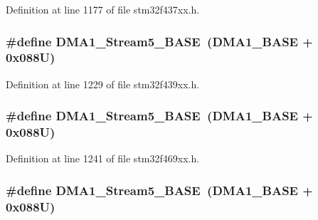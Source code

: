 Definition at line 1177 of file stm32f437xx.\+h.

\subsubsection[{\texorpdfstring{D\+M\+A1\+\_\+\+Stream5\+\_\+\+B\+A\+SE}{DMA1_Stream5_BASE}}]{\setlength{\rightskip}{0pt plus 5cm}\#define D\+M\+A1\+\_\+\+Stream5\+\_\+\+B\+A\+SE~({\bf D\+M\+A1\+\_\+\+B\+A\+SE} + 0x088\+U)}\hypertarget{group___peripheral__memory__map_ga0ded7bed8969fe2e2d616e7f90eb7654}{}\label{group___peripheral__memory__map_ga0ded7bed8969fe2e2d616e7f90eb7654}


Definition at line 1229 of file stm32f439xx.\+h.

\subsubsection[{\texorpdfstring{D\+M\+A1\+\_\+\+Stream5\+\_\+\+B\+A\+SE}{DMA1_Stream5_BASE}}]{\setlength{\rightskip}{0pt plus 5cm}\#define D\+M\+A1\+\_\+\+Stream5\+\_\+\+B\+A\+SE~({\bf D\+M\+A1\+\_\+\+B\+A\+SE} + 0x088\+U)}\hypertarget{group___peripheral__memory__map_ga0ded7bed8969fe2e2d616e7f90eb7654}{}\label{group___peripheral__memory__map_ga0ded7bed8969fe2e2d616e7f90eb7654}


Definition at line 1241 of file stm32f469xx.\+h.

\subsubsection[{\texorpdfstring{D\+M\+A1\+\_\+\+Stream5\+\_\+\+B\+A\+SE}{DMA1_Stream5_BASE}}]{\setlength{\rightskip}{0pt plus 5cm}\#define D\+M\+A1\+\_\+\+Stream5\+\_\+\+B\+A\+SE~({\bf D\+M\+A1\+\_\+\+B\+A\+SE} + 0x088\+U)}\hypertarget{group___peripheral__memory__map_ga0ded7bed8969fe2e2d616e7f90eb7654}{}\label{group___peripheral__memory__map_ga0ded7bed8969fe2e2d616e7f90eb7654}


